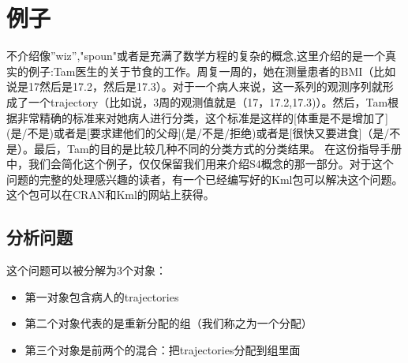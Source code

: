 \documentclass[12pt,a4paper]{article}\usepackage{graphicx, color}
\begin{document}
\section{例子}
不介绍像”wiz”,"spoun"或者是充满了数学方程的复杂的概念,这里介绍的是一个真实的例子:Tam医生的关于节食的工作。周复一周的，她在测量患者的BMI（比如说是17然后是17.2，然后是17.3）。对于一个病人来说，这一系列的观测序列就形成了一个trajectory（比如说，3周的观测值就是（17，17.2,17.3)）。然后，Tam根据非常精确的标准来对她病人进行分类，这个标准是这样的[体重是不是增加了](是/不是)或者是[要求建他们的父母](是/不是/拒绝)或者是[很快又要进食]（是/不是）。最后，Tam的目的是比较几种不同的分类方式的分类结果。
在这份指导手册中，我们会简化这个例子，仅仅保留我们用来介绍S4概念的那一部分。对于这个问题的完整的处理感兴趣的读者，有一个已经编写好的Kml包可以解决这个问题。这个包可以在CRAN和Kml的网站上获得。
\subsection{分析问题}
这个问题可以被分解为3个对象：
\begin{itemize}
  \item 第一对象包含病人的trajectories
  \item 第二个对象代表的是重新分配的组（我们称之为一个分配）
  \item 第三个对象是前两个的混合：把trajectories分配到组里面
\end{itemize}
\end{document}
